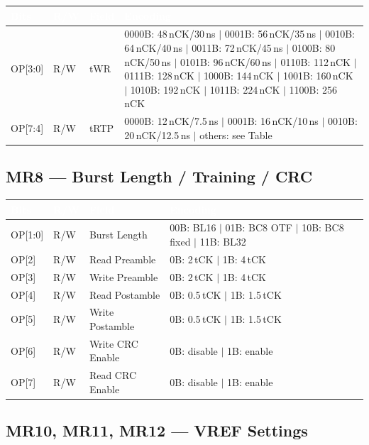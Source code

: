 \documentclass[10pt,a4paper,twoside]{article}
\newcommand{\thd}[1]{\cellcolor{navyblue}\textcolor{white}{\textbf{#1}}}
\newcommand{\trow}{\rowcolor{lightgray}}
\newcommand{\talt}{\rowcolor{skyblue!30}}
\begin{document}
\begin{center}
\begin{tabularx}{\linewidth}{@{} l l l X @{}}
\toprule
\thd{Bits} & \thd{R/W} & \thd{Field} & \thd{Encoding} \\
\midrule
\trow OP[3:0] & R/W & tWR &
  0000B: 48\,nCK/30\,ns $|$ 0001B: 56\,nCK/35\,ns $|$ 0010B: 64\,nCK/40\,ns $|$
  0011B: 72\,nCK/45\,ns $|$ 0100B: 80\,nCK/50\,ns $|$ 0101B: 96\,nCK/60\,ns $|$
  0110B: 112\,nCK $|$ 0111B: 128\,nCK $|$ 1000B: 144\,nCK $|$ 1001B: 160\,nCK $|$
  1010B: 192\,nCK $|$ 1011B: 224\,nCK $|$ 1100B: 256\,nCK \\
\talt OP[7:4] & R/W & tRTP &
  0000B: 12\,nCK/7.5\,ns $|$ 0001B: 16\,nCK/10\,ns $|$ 0010B: 20\,nCK/12.5\,ns $|$
  others: see Table \\
\bottomrule
\end{tabularx}
\end{center}

\subsection{MR8 --- Burst Length / Training / CRC}

\begin{center}
\begin{tabularx}{\linewidth}{@{} l l l X @{}}
\toprule
\thd{Bits} & \thd{R/W} & \thd{Field} & \thd{Encoding} \\
\midrule
\trow OP[1:0] & R/W & Burst Length & 00B: BL16 $|$ 01B: BC8 OTF $|$ 10B: BC8 fixed $|$ 11B: BL32 \\
\talt OP[2] & R/W & Read Preamble & 0B: 2\,tCK $|$ 1B: 4\,tCK \\
\trow OP[3] & R/W & Write Preamble & 0B: 2\,tCK $|$ 1B: 4\,tCK \\
\talt OP[4] & R/W & Read Postamble & 0B: 0.5\,tCK $|$ 1B: 1.5\,tCK \\
\trow OP[5] & R/W & Write Postamble & 0B: 0.5\,tCK $|$ 1B: 1.5\,tCK \\
\talt OP[6] & R/W & Write CRC Enable & 0B: disable $|$ 1B: enable \\
\trow OP[7] & R/W & Read CRC Enable & 0B: disable $|$ 1B: enable \\
\bottomrule
\end{tabularx}
\end{center}

\subsection{MR10, MR11, MR12 --- VREF Settings}
\end{document}
